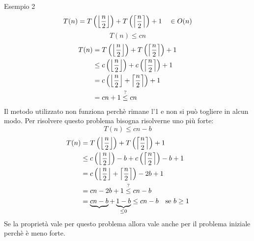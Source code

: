 \documentclass[a4paper]{article}
\DeclarePairedDelimiter\ceil{\lceil}{\rceil}
\DeclarePairedDelimiter\floor{\lfloor}{\rfloor}
\begin{document}
\begin{examplebox}{Esempio 2}
  \[
    T(n) = T\left(\floor*{\frac{n}{2}}\right) + T\left(\ceil*{\frac{n}{2}}\right) + 1 \quad \in O(n)
  \] 
  \[
  T(n) \le cn
  \] 
  \[
  \begin{aligned}
    T(n) & = T\left(\floor*{\frac{n}{2}}\right) + T\left(\ceil*{\frac{n}{2}}\right) + 1\\
         & \le c\left(\floor*{\frac{n}{2}}\right) + c\left(\ceil*{\frac{n}{2}}\right) + 1\\
         & = c \left( \left\lfloor \frac{n}{2} \right\rfloor + \left\lceil \frac{n}{2} \right\rceil  \right) + 1\\
         & = cn + 1 \stackrel{?}{\le} cn
  \end{aligned}
  \] 
  Il metodo utilizzato non funziona perchè rimane l'1 e non si può togliere in alcun modo.
  Per risolvere questo problema bisogna risolverne uno più forte:
  \[
  T(n) \le cn - b
  \] 
  \[
  \begin{aligned}
    T(n) & = T\left(\floor*{\frac{n}{2}}\right) + T\left(\ceil*{\frac{n}{2}}\right) + 1\\
         & \le c\left(\floor*{\frac{n}{2}}\right) -b + c\left(\ceil*{\frac{n}{2}}\right) -b + 1\\
         & = c \left( \left\lfloor \frac{n}{2} \right\rfloor + \left\lceil \frac{n}{2} \right\rceil  \right) - 2b + 1\\
         & = cn - 2b + 1 \stackrel{?}{\le} cn - b\\
         & = \underbrace{cn - b} + \underbrace{1 - b}_{\le 0} \le cn - b \quad \text{se } b \ge 1\\
  \end{aligned}
  \] 
  Se la proprietà vale per questo problema allora vale anche per il problema iniziale
  perchè è meno forte.
\end{examplebox}
\end{document}
